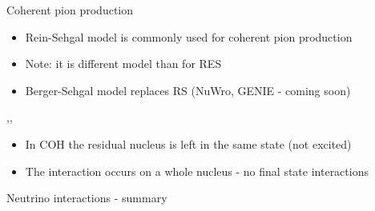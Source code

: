\begin{slide}[toc=COH pion production]{Coherent pion production}
\null\vfill

  \twocolumn
  {
    \begin{itemize}
      \item Rein-Sehgal model is commonly used for coherent pion production
      \item Note: it is different model than for RES
      \item Berger-Sehgal model replaces RS (NuWro, GENIE - coming soon)
    \end{itemize}
  }
  {
    \sep\sep
    \scalebox{0.75}{}
  }
  
  \vspace*{-10pt}
  
  
  \begin{itemize}
    \item In COH the residual nucleus is left in the same state (not excited)
    \item The interaction occurs on a whole nucleus - no final state interactions
  \end{itemize}

\vfill\null
\end{slide}

\begin{slide}[toc=Summary]{Neutrino interactions - summary}
\null\vfill

  

\vfill\null
\end{slide}
